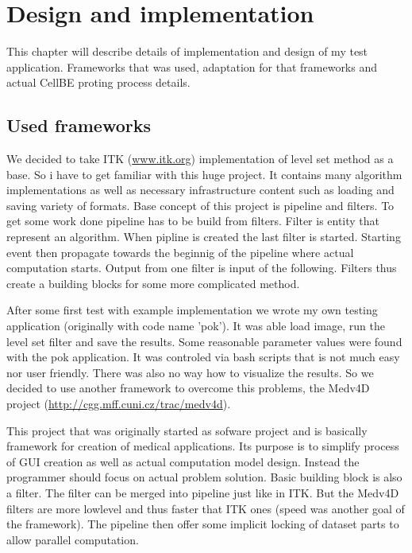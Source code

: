 \chapter{Design and implementation}

This chapter will describe details of implementation and design of my test application.
Frameworks that was used, adaptation for that frameworks and actual CellBE proting process details.

\section{Used frameworks}

\par
We decided to take ITK (\url{www.itk.org}) implementation of level set method as a base.
So i have to get familiar with this huge project.
It contains many algorithm implementations as well as necessary infrastructure content such as loading and saving variety of formats.
Base concept of this project is pipeline and filters.
To get some work done pipeline has to be build from filters.
Filter is entity that represent an algorithm.
When pipline is created the last filter is started.
Starting event then propagate towards the beginnig of the pipeline where actual computation starts.
Output from one filter is input of the following.
Filters thus create a building blocks for some more complicated method.

\par
After some first test with example implementation we wrote my own testing application (originally with code name 'pok').
It was able load image, run the level set filter and save the results.
Some reasonable parameter values were found with the pok application.
It was controled via bash scripts that is not much easy nor user friendly.
There was also no way how to visualize the results.
So we decided to use another framework to overcome this problems, the Medv4D project (\url{http://cgg.mff.cuni.cz/trac/medv4d}).

\par
This project that was originally started as sofware project and is basically framework for creation of medical applications.
Its purpose is to simplify process of GUI creation as well as actual computation model design.
Instead the programmer should focus on actual problem solution.
Basic building block is also a filter.
The filter can be merged into pipeline just like in ITK.
But the Medv4D filters are more lowlevel and thus faster that ITK ones (speed was another goal of the framework).
The pipeline then offer some implicit locking of dataset parts to allow parallel computation.

